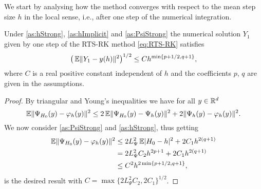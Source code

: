 \documentclass[10pt]{article}
\begin{document}
We start by analysing how the method converges with respect to the mean step size $h$ in the local sense, i.e., after one step of the numerical integration.
\begin{lemma}\label{thm:StrongOrderLocal} Under \cref{as:hStrong}, \cref{as:hImplicit} and \cref{as:PsiStrong} the numerical solution $Y_1$ given by one step of the RTS-RK method \eqref{eq:RTS-RK} satisfies 
	\begin{equation}\label{eq:StrongOrderLocal}
		\big(\operatorname{\mathbb{E}}\lVert Y_1 - y(h)\rVert^2\big)^{1/2} \leq C h^{\min\{p+1/2, q + 1\}},
	\end{equation}
	where $C$ is a real positive constant independent of $h$  and the coefficients $p$, $q$ are given in the assumptions.
\end{lemma}
\begin{proof} By triangular and Young's inequalities we have for all $y \in \mathbb{R}^d$ 
	\begin{equation}
		\operatorname{\mathbb{E}}\lVert\Psi_{H_0}(y) - \varphi_h(y)\rVert^2 \leq 2\operatorname{\mathbb{E}}\lVert\Psi_{H_0}(y) - \Psi_h(y)\rVert^2 + 2\lVert\Psi_h(y) - \varphi_h(y)\rVert^2.
	\end{equation}		
	We now consider \cref{as:PsiStrong} and \cref{as:hStrong}, thus getting
	\begin{equation}\label{eq:LocalErrorDecomposition}
	\begin{aligned}
		\operatorname{\mathbb{E}}\lVert\Psi_{H_0}(y) - \varphi_h(y)\rVert^2 &\leq 2L_{\Psi}^2 \operatorname{\mathbb{E}}\lvert H_0 - h\rvert^2 + 2C_1 h^{2(q+1)} \\
		&= 2L_{\Psi}^2 C_2 h^{2p+1} + 2 C_1 h^{2(q+1)} \\
		&\leq C^2 h^{2\min\{p+1/2,q+1\}},
	\end{aligned}
	\end{equation}
	 is the desired result with $C = \max\{2L_{\Psi}^2 C_2, 2 C_1\}^{1/2}$.
\end{proof}
\end{document}
